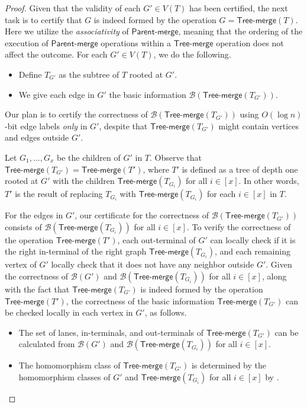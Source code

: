 \documentclass[11pt]{article}
\theoremstyle{definition}
\theoremstyle{remark}
\newcommand{\tmerge}{\mathsf{Tree}\text{-}\mathsf{merge}}
\newcommand{\pmerge}{\mathsf{Parent}\text{-}\mathsf{merge}}
\begin{document}
\begin{proof}
 Given that the validity of each $G' \in V(T)$ has been certified, the next task is to certify that $G$ is indeed formed by the operation $G=\tmerge(T)$. Here we utilize the \emph{associativity} of $\pmerge$, meaning that the ordering of the execution of $\pmerge$ operations within a $\tmerge$ operation does not affect the outcome. For each $G' \in V(T)$, we do the following.
 \begin{itemize}
     \item Define $T_{G'}$ as the subtree of $T$ rooted at $G'$.
     \item We give each edge in $G'$ the basic information $\mathcal{B}(\tmerge(T_{G'}))$.
 \end{itemize}
 Our plan is to certify the correctness of $\mathcal{B}(\tmerge(T_{G'}))$ using $O(\log n)$-bit edge labels \emph{only} in $G'$, despite that $\tmerge(T_{G'})$ might contain vertices and edges outside $G'$. 
 
 Let $G_1, \ldots, G_x$ be the children of $G'$ in $T$. Observe that $\tmerge(T_{G'}) = \tmerge(T')$, where $T'$ is defined as a tree of depth one rooted at $G'$ with the children  $\tmerge(T_{G_i})$ for all $i \in [x]$. In other words, $T'$ is the result of replacing $T_{G_i}$ with $\tmerge(T_{G_i})$ for each $i \in [x]$ in $T$. 

 For the edges in $G'$, our certificate for the correctness of $\mathcal{B}(\tmerge(T_{G'}))$ consists of  $\mathcal{B}(\tmerge(T_{G_i}))$ for all $i \in [x]$. To verify the correctness of the operation $\tmerge(T')$, each out-terminal of $G'$ can locally check if it is the right in-terminal of the right graph $\tmerge(T_{G_i})$, and each remaining vertex of $G'$ locally check that it does not have any neighbor outside $G'$. Given the correctness of $\mathcal{B}(G')$ and $\mathcal{B}(\tmerge(T_{G_i}))$ for all $i \in [x]$, along
 with the fact that $\tmerge(T_{G'})$ is indeed formed by the operation $\tmerge(T')$, the correctness of the basic information $\tmerge(T_{G'})$ can be checked locally in each vertex in $G'$, as follows.
\begin{itemize}
    \item The set of lanes, in-terminals, and out-terminals of $\tmerge(T_{G'})$ can be calculated from $\mathcal{B}(G')$ and $\mathcal{B}(\tmerge(T_{G_i}))$ for all $i \in [x]$.
    \item The homomorphism class of $\tmerge(T_{G'})$ is determined by the homomorphism classes of $G'$ and $\tmerge(T_{G_i})$ for all $i \in [x]$ by .
\end{itemize}


\end{proof}
\end{document}
